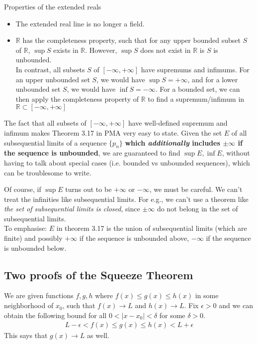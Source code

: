 \documentclass{article}
\begin{document}
Properties of the extended reals
\begin{itemize}
	\item The extended real line is no longer a field.
	\item $\mathbb{R}$ has the completeness property, such that for any upper bounded subset $S$ of $\mathbb{R}$, $\sup S$ exists in $\mathbb{R}$. However, $\sup S$ does not exist in $\mathbb{R}$ is $S$ is unbounded.\\
	 In contrast, all subsets $S$ of $[-\infty, +\infty]$ have supremums and infimums. For an upper unbounded set $S$, we would have $\sup S = + \infty$, and for a lower unbounded set $S$, we would have $\inf S = -\infty$. For a bounded set, we can then apply the completeness property of $\mathbb{R}$ to find a supremum/infimum in $\mathbb{R}\subset [-\infty, +\infty]$
\end{itemize}

The fact that all subsets of $[-\infty, +\infty]$ have well-defined supremum and infimum makes Theorem 3.17 in PMA very easy to state. Given the set $E$ of all subsequential limits of a sequence $\{p_n\}$ \textbf{which \textit{additionally} includes $\pm \infty$ if the sequence is unbounded}, we are guaranteed to find $\sup E, \inf E$, without having to talk about special cases (i.e. bounded vs unbounded sequences), which can be troublesome to write.

Of course, if $\sup E$ turns out to be $+\infty$ or $-\infty$, we must be careful. We can't treat the infinities like subsequential limits. For e.g., we can't use a theorem like \textit{the set of subsequential limits is closed}, since $\pm \infty$ do not belong in the set of subsequential limits.\\
To emphasise: $E$ in theorem 3.17 is the union of subsequential limits (which are finite) and possibly $+\infty$ if the sequence is unbounded above, $-\infty$ if the sequence is unbounded below.


\subsection{Two proofs of the Squeeze Theorem}
We are given functions $f,g,h$ where $f(x)\leq g(x)\leq h(x)$ in some neighborhood of $x_0$, such that $f(x)\rightarrow L$ and $h(x)\rightarrow L$. Fix $\epsilon > 0$ and we can obtain the following bound for all $0 < |x - x_0| < \delta$ for some $\delta > 0$.
\begin{align*}
	L - \epsilon < f(x) \leq g(x) \leq h(x) < L + \epsilon
\end{align*}
This says that $g(x)\rightarrow L$ as well.
\end{document}
